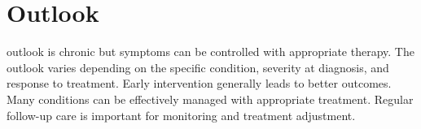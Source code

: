 \section{Outlook}
outlook is chronic but symptoms can be controlled with appropriate therapy. The outlook varies depending on the specific condition, severity at diagnosis, and response to treatment. Early intervention generally leads to better outcomes. Many conditions can be effectively managed with appropriate treatment. Regular follow-up care is important for monitoring and treatment adjustment.
